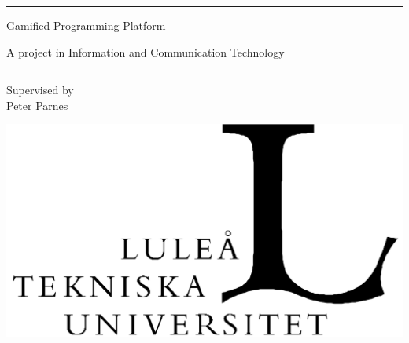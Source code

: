 \vspace{2\baselineskip}

\rule{\linewidth}{.02cm}

\vspace{\baselineskip}

\begin{minipage}{.45\linewidth}
\raggedright\Huge Gamified Programming Platform
\end{minipage}
\hfill
\begin{minipage}{.45\linewidth}
\raggedleft\Large A project in Information and Communication Technology
\end{minipage}

\vspace{-2\baselineskip}

\vfill

\Large\it\LTU

\vspace{-.33\baselineskip}
\rule{\widthof{\LTU{}}}{.02cm}
\vspace{.66\baselineskip}

\begin{minipage}{.45\linewidth}
\Large\it\SRT
\end{minipage}

\vfill

\begin{minipage}[b]{.45\linewidth}
{\large Supervised by\\ Peter Parnes}
\vspace{\baselineskip}
\end{minipage}
\hfill
\begin{minipage}[b]{.35\linewidth}
\includegraphics[width=\linewidth]{img/LTU_logo.png}
\end{minipage}
